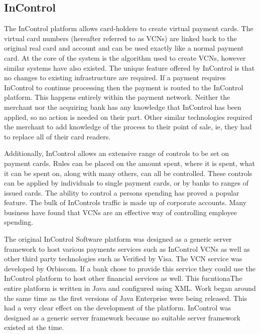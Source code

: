 \documentclass[a4paper, 11pt, titlepage]{article}
\begin{document}
\subsection{InControl}
The InControl platform allows card-holders to create virtual payment cards. The virtual card numbers (hereafter referred to as VCNs) are linked back to the original real card and account and can be used exactly like a normal payment card. At the core of the system is the algorithm used to create VCNs, however similar systems have also existed. The unique feature offered by InControl is that no changes to existing infrastructure are required. If a payment requires InControl to continue processing then the payment is routed to the InControl platform. This happens entirely within the payment network. Neither the merchant nor the acquiring bank has any knowledge that InControl has been applied, so no action is needed on their part. Other similar technologies required the merchant to add knowledge of the process to their point of sale, ie, they had to replace all of their card readers.

Additionally, InControl allows an extensive range of controls to be set on payment cards. Rules can be placed on the amount spent, where it is spent, what it can be spent on, along with many others, can all be controlled. These controls can be applied by individuals to single payment cards, or by banks to ranges of issued cards. The ability to control a persons spending has proved a popular feature. The bulk of InControls traffic is made up of corporate accounts. Many business have found that VCNs are an effective way of controlling employee spending. 

The original InControl Software platform was designed as a generic server framework to host various payments services such as InControl VCNs as well as other third party technologies such as Verified by Visa. The VCN service was developed by Orbiscom. If a bank chose to provide this service they could use the InControl platform to host other financial services as well. This fucntionaThe entire platform is written in Java and configured using XML. Work began around the same time as the first versions of Java Enterprise were being released. This had a very clear effect on the development of the platform. InControl was designed as a generic server framework because no suitable server framework existed at the time.
\end{document}
